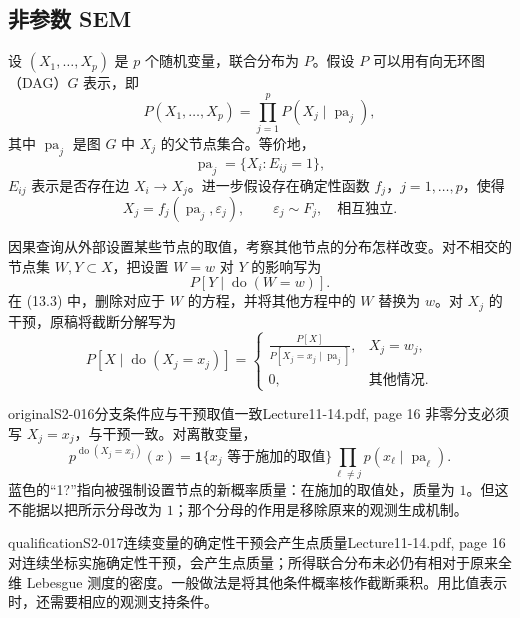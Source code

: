 \subsection{非参数 SEM}
设 $(X_1,\ldots,X_p)$ 是 $p$ 个随机变量，联合分布为 $P$。假设 $P$ 可以用有向无环图（DAG）$G$ 表示，即
\[
 P(X_1,\ldots,X_p)=\prod_{j=1}^p P(X_j\mid\operatorname{pa}_j),\tag{13.2}
\]
其中 $\operatorname{pa}_j$ 是图 $G$ 中 $X_j$ 的父节点集合。等价地，
\[
 \operatorname{pa}_j=\{X_i:E_{ij}=1\},
\]
$E_{ij}$ 表示是否存在边 $X_i\to X_j$。进一步假设存在确定性函数 $f_j$，$j=1,\ldots,p$，使得
\[
 X_j=f_j(\operatorname{pa}_j,\varepsilon_j),\qquad
 \varepsilon_j\sim F_j,\quad\text{相互独立}.\tag{13.3}
\]

因果查询从外部设置某些节点的取值，考察其他节点的分布怎样改变。对不相交的节点集 $W,Y\subset X$，把设置 $W=w$ 对 $Y$ 的影响写为
\[
 P[Y\mid\operatorname{do}(W=w)].
\]
在 (13.3) 中，删除对应于 $W$ 的方程，并将其他方程中的 $W$ 替换为 $w$。对 $X_j$ 的干预，原稿将截断分解写为
\[
 P[X\mid\operatorname{do}(X_j=x_j)]
 =\begin{cases}
 \displaystyle\frac{P[X]}{P[X_j=x_j\mid\operatorname{pa}_j]},&X_j=w_j,\\
 0,&\text{其他情况}.
 \end{cases}
\]

\begin{reviewnote}{original}{S2-016}{分支条件应与干预取值一致}{Lecture11-14.pdf, page 16}
非零分支必须写 $X_j=x_j$，与干预一致。对离散变量，
\[
 p^{\operatorname{do}(X_j=x_j)}(x)
 =\mathbf1\{x_j\text{ 等于施加的取值}\}\prod_{\ell\ne j}p(x_\ell\mid\operatorname{pa}_\ell).
\]
蓝色的“1?”指向被强制设置节点的新概率质量：在施加的取值处，质量为 $1$。但这不能据以把所示分母改为 $1$；那个分母的作用是移除原来的观测生成机制。
\end{reviewnote}

\begin{reviewnote}{qualification}{S2-017}{连续变量的确定性干预会产生点质量}{Lecture11-14.pdf, page 16}
对连续坐标实施确定性干预，会产生点质量；所得联合分布未必仍有相对于原来全维 Lebesgue 测度的密度。一般做法是将其他条件概率核作截断乘积。用比值表示时，还需要相应的观测支持条件。
\end{reviewnote}


